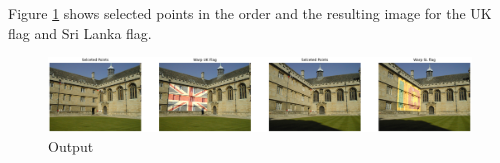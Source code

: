 \documentclass[a4paper]{article}
\begin{document}
Figure \ref{q2} shows selected points in the order and the resulting
     image for the UK flag and Sri Lanka flag.


\begin{figure}[!htb]
  \centering
  \includegraphics[width=\textwidth]{images/q22.png}
  \caption{Output}
  \label{q2}
\end{figure}
\end{document}
